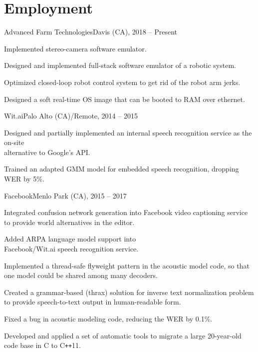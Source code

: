 \documentclass[11pt,a4paper]{article}
\begin{document}
\section{Employment}
\begin{multicols}{2}
  \raggedcolumns

  \begin{project1}{Advanced Farm Technologies}{Davis (CA), 2018 -- Present}
    \begin{items}
    \item Implemented stereo-camera software emulator.
    \item Designed and implemented full-stack software emulator of a robotic system.
    \item Optimized closed-loop robot control system to get rid of the robot arm jerks.
    \item Designed a soft real-time OS image that can be booted to RAM over ethernet.
    \end{items}
  \end{project1}

  \begin{project1}{Wit.ai}{Palo Alto (CA)/Remote, 2014 -- 2015}
    \begin{items}
    \item Designed and partially implemented an internal speech recognition
      service as the on-site\\alternative to Google's API.
    \item Trained an adapted GMM model for embedded speech recognition,
      dropping WER by 5\%.
    \end{items}
  \end{project1}

  \columnbreak

  \begin{project1}{Facebook}{Menlo Park (CA), 2015 -- 2017}
    \begin{items}
    \item Integrated confusion network generation into Facebook video
      captioning service to provide world alternatives in the editor.
    \item Added ARPA language model support into\\Facebook/Wit.ai speech
      recognition service.
    \item Implemented a thread-safe flyweight pattern in the acoustic model
      code, so that one model could be shared among many decoders.
    \item Created a grammar-based (thrax) solution for inverse text
      normalization problem to provide speech-to-text output in human-readable
      form.
    \item Fixed a bug in acoustic modeling code, reducing the WER by 0.1\%.
    \item Developed and applied a set of automatic tools to migrate a large
      20-year-old code base in C to C\texttt{++}11.
    \end{items}
  \end{project1}


\end{multicols}
\end{document}
